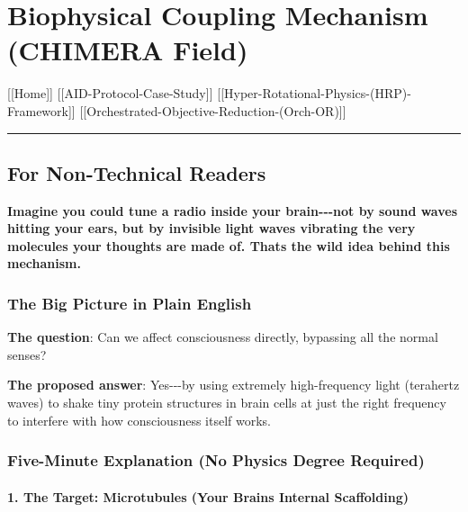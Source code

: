 \section{Biophysical Coupling Mechanism (CHIMERA
Field)}\label{biophysical-coupling-mechanism-chimera-field}

{[}{[}Home{]}{]} \textbar{} {[}{[}AID-Protocol-Case-Study{]}{]}
\textbar{} {[}{[}Hyper-Rotational-Physics-(HRP)-Framework{]}{]}
\textbar{} {[}{[}Orchestrated-Objective-Reduction-(Orch-OR){]}{]}

\begin{center}\rule{0.5\linewidth}{0.5pt}\end{center}

\subsection{\texorpdfstring{ For Non-Technical
Readers}{ For Non-Technical Readers}}\label{for-non-technical-readers}

\textbf{Imagine you could tune a radio inside your brain-\/-\/-not by
sound waves hitting your ears, but by invisible light waves vibrating
the very molecules your thoughts are made of. That\textquotesingle s the
wild idea behind this mechanism.}

\subsubsection{The Big Picture in Plain
English}\label{the-big-picture-in-plain-english}

\textbf{The question}: Can we affect consciousness directly, bypassing
all the normal senses?

\textbf{The proposed answer}: Yes-\/-\/-by using extremely
high-frequency light (terahertz waves) to shake tiny protein structures
in brain cells at just the right frequency to interfere with how
consciousness itself works.

\subsubsection{Five-Minute Explanation (No Physics Degree
Required)}\label{five-minute-explanation-no-physics-degree-required}

\paragraph{\texorpdfstring{1. \textbf{The Target: Microtubules (Your
Brain\textquotesingle s Internal
Scaffolding)}}{1. The Target: Microtubules (Your Brain\textquotesingle s Internal Scaffolding)}}\label{the-target-microtubules-your-brains-internal-scaffolding}

